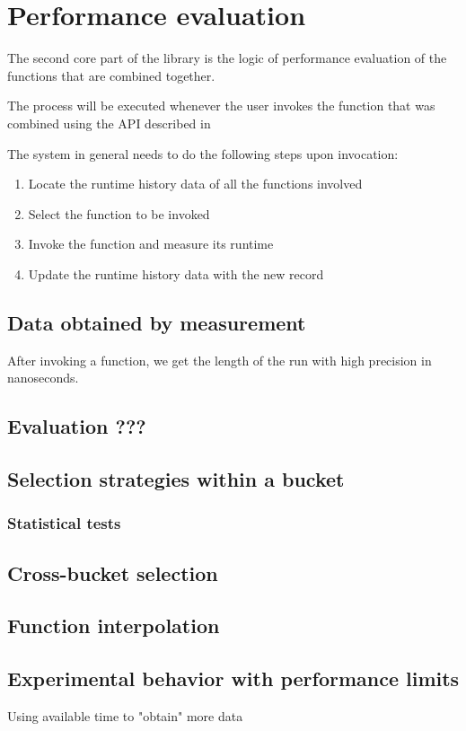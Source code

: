 \chapter{Performance evaluation}

The second core part of the library is the logic of performance evaluation of the functions that are combined together.

The process will be executed whenever the user invokes the function that was combined using the API described in %

The system in general needs to do the following steps upon invocation:

\begin{enumerate}
	\item Locate the runtime history data of all the functions involved
	\item Select the function to be invoked
	\item Invoke the function and measure its runtime
	\item Update the runtime history data with the new record
\end{enumerate}

\section{Data obtained by measurement}

After invoking a function, we get the length of the run with high precision in nanoseconds.

\section{Evaluation ???}

\section{Selection strategies within a bucket}

\subsection{Statistical tests}

\section{Cross-bucket selection}

\section{Function interpolation}

\section{Experimental behavior with performance limits}
Using available time to "obtain" more data

